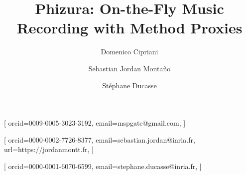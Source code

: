 \documentclass[
]{ceurart}
\begin{document}


\title{Phizura: On-the-Fly Music Recording with Method Proxies}



\author[1]{Domenico Cipriani}[%
orcid=0009-0005-3023-3192,
email=mspgate@gmail.com,
]


\author[1]{Sebastian {Jordan Montaño}}[%
orcid=0000-0002-7726-8377,
email=sebastian.jordan@inria.fr,
url=https://jordanmontt.fr,
]

\author[1]{Stéphane Ducasse}[
orcid=0000-0001-6070-6599,
email=stephane.ducasse@inria.fr,
]

\address[1]{Univ. Lille, Inria, CNRS, Centrale Lille, UMR 9189 CRIStAL, Park Plaza, Parc scientifique de la Haute-Borne, 40 Av. Halley Bât A, 59650 Villeneuve-d’Ascq, France}
\end{document}
